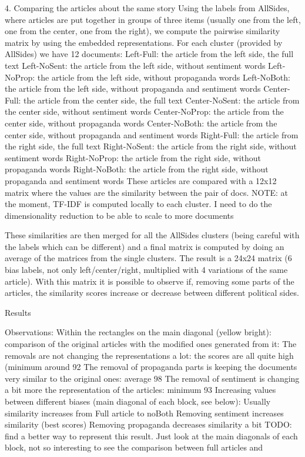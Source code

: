 4. Comparing the articles about the same story
Using the labels from AllSides, where articles are put together in groups of three items (usually one from the left, one from the center, one from the right), we compute the pairwise similarity matrix by using the embedded representations.
For each cluster (provided by AllSides) we have 12 documents:
Left-Full: the article from the left side, the full text
Left-NoSent: the article from the left side, without sentiment words
Left-NoProp: the article from the left side, without propaganda words
Left-NoBoth: the article from the left side, without propaganda and sentiment words
Center-Full: the article from the center side, the full text
Center-NoSent: the article from the center side, without sentiment words
Center-NoProp: the article from the center side, without propaganda words
Center-NoBoth: the article from the center side, without propaganda and sentiment words
Right-Full: the article from the right side, the full text
Right-NoSent: the article from the right side, without sentiment words
Right-NoProp: the article from the right side, without propaganda words
Right-NoBoth: the article from the right side, without propaganda and sentiment words
These articles are compared with a 12x12 matrix where the values are the similarity between the pair of docs.
NOTE: at the moment, TF-IDF is computed locally to each cluster. I need to do the dimensionality reduction to be able to scale to more documents

These similarities are then merged for all the AllSides clusters (being careful with the labels which can be different) and a final matrix is computed by doing an average of the matrices from the single clusters.
The result is a 24x24 matrix (6 bias labels, not only left/center/right, multiplied with 4 variations of the same article).
With this matrix it is possible to observe if, removing some parts of the articles, the similarity scores increase or decrease between different political sides.


Results


Observations:
Within the rectangles on the main diagonal (yellow bright): comparison of the original articles with the modified ones generated from it:
The removals are not changing the representations a lot: the scores are all quite high (minimum around 92%
The removal of propaganda parts is keeping the documents very similar to the original ones: average 98%
The removal of sentiment is changing a bit more the representation of the articles: minimum 93%
Increasing values between different biases (main diagonal of each block, see below):
Usually similarity increases from Full article to noBoth
Removing sentiment increases similarity (best scores)
Removing propaganda decreases similarity a bit
TODO: find a better way to represent this result. Just look at the main diagonals of each block, not so interesting to see the comparison between full articles and 

